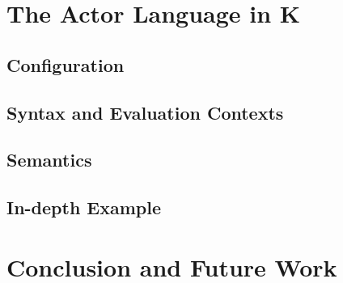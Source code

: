 \documentclass{llncs}
\begin{document}
\section{The Actor Language in K}
\subsection{Configuration}
\subsection{Syntax and Evaluation Contexts}
\subsection{Semantics}
\subsection{In-depth Example}

\section{Conclusion and Future Work}

%
%



\end{document}
